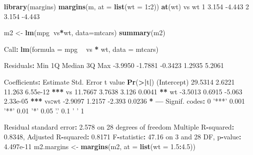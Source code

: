 \documentclass[]{article}
\newenvironment{Shaded}{\begin{snugshade}}{\end{snugshade}}
\newcommand{\DataTypeTok}[1]{\textcolor[rgb]{0.13,0.29,0.53}{#1}}
\newcommand{\DecValTok}[1]{\textcolor[rgb]{0.00,0.00,0.81}{#1}}
\newcommand{\ErrorTok}[1]{\textcolor[rgb]{0.64,0.00,0.00}{\textbf{#1}}}
\newcommand{\FloatTok}[1]{\textcolor[rgb]{0.00,0.00,0.81}{#1}}
\newcommand{\KeywordTok}[1]{\textcolor[rgb]{0.13,0.29,0.53}{\textbf{#1}}}
\newcommand{\NormalTok}[1]{#1}
\newcommand{\OperatorTok}[1]{\textcolor[rgb]{0.81,0.36,0.00}{\textbf{#1}}}
\newcommand{\StringTok}[1]{\textcolor[rgb]{0.31,0.60,0.02}{#1}}
\begin{document}
\begin{Shaded}
\begin{Highlighting}[]
\KeywordTok{library}\NormalTok{(margins)}
\KeywordTok{margins}\NormalTok{(m, }\DataTypeTok{at =} \KeywordTok{list}\NormalTok{(}\DataTypeTok{wt =} \DecValTok{1}\OperatorTok{:}\DecValTok{2}\NormalTok{))}
 \KeywordTok{at}\NormalTok{(wt)    vs     wt}
      \DecValTok{1} \FloatTok{3.154} \FloatTok{-4.443}
      \DecValTok{2} \FloatTok{3.154} \FloatTok{-4.443}

\NormalTok{m2 <-}\StringTok{ }\KeywordTok{lm}\NormalTok{(mpg}\OperatorTok{~}\NormalTok{vs}\OperatorTok{*}\NormalTok{wt, }\DataTypeTok{data=}\NormalTok{mtcars)}
\KeywordTok{summary}\NormalTok{(m2)}

\NormalTok{Call}\OperatorTok{:}
\KeywordTok{lm}\NormalTok{(}\DataTypeTok{formula =}\NormalTok{ mpg }\OperatorTok{~}\StringTok{ }\NormalTok{vs }\OperatorTok{*}\StringTok{ }\NormalTok{wt, }\DataTypeTok{data =}\NormalTok{ mtcars)}

\NormalTok{Residuals}\OperatorTok{:}
\StringTok{    }\NormalTok{Min      1Q  Median      3Q     Max }
\FloatTok{-3.9950} \FloatTok{-1.7881} \FloatTok{-0.3423}  \FloatTok{1.2935}  \FloatTok{5.2061} 

\NormalTok{Coefficients}\OperatorTok{:}
\StringTok{            }\NormalTok{Estimate Std. Error t value }\KeywordTok{Pr}\NormalTok{(}\OperatorTok{>}\ErrorTok{|}\NormalTok{t}\OperatorTok{|}\NormalTok{)    }
\NormalTok{(Intercept)  }\FloatTok{29.5314}     \FloatTok{2.6221}  \FloatTok{11.263} \FloatTok{6.55e-12} \OperatorTok{**}\ErrorTok{*}
\NormalTok{vs           }\FloatTok{11.7667}     \FloatTok{3.7638}   \FloatTok{3.126}   \FloatTok{0.0041} \OperatorTok{**}\StringTok{ }
\NormalTok{wt           }\FloatTok{-3.5013}     \FloatTok{0.6915}  \FloatTok{-5.063} \FloatTok{2.33e-05} \OperatorTok{**}\ErrorTok{*}
\NormalTok{vs}\OperatorTok{:}\NormalTok{wt        }\FloatTok{-2.9097}     \FloatTok{1.2157}  \FloatTok{-2.393}   \FloatTok{0.0236} \OperatorTok{*}\StringTok{  }
\OperatorTok{---}
\NormalTok{Signif. codes}\OperatorTok{:}\StringTok{  }\DecValTok{0} \StringTok{'***'} \FloatTok{0.001} \StringTok{'**'} \FloatTok{0.01} \StringTok{'*'} \FloatTok{0.05} \StringTok{'.'} \FloatTok{0.1} \StringTok{' '} \DecValTok{1}

\NormalTok{Residual standard error}\OperatorTok{:}\StringTok{ }\FloatTok{2.578}\NormalTok{ on }\DecValTok{28}\NormalTok{ degrees of freedom}
\NormalTok{Multiple R}\OperatorTok{-}\NormalTok{squared}\OperatorTok{:}\StringTok{  }\FloatTok{0.8348}\NormalTok{,    Adjusted R}\OperatorTok{-}\NormalTok{squared}\OperatorTok{:}\StringTok{  }\FloatTok{0.8171} 
\NormalTok{F}\OperatorTok{-}\NormalTok{statistic}\OperatorTok{:}\StringTok{ }\FloatTok{47.16}\NormalTok{ on }\DecValTok{3}\NormalTok{ and }\DecValTok{28}\NormalTok{ DF,  p}\OperatorTok{-}\NormalTok{value}\OperatorTok{:}\StringTok{ }\FloatTok{4.497e-11}
\NormalTok{m2.margins <-}\StringTok{ }\KeywordTok{margins}\NormalTok{(m2, }\DataTypeTok{at =} \KeywordTok{list}\NormalTok{(}\DataTypeTok{wt =} \FloatTok{1.5}\OperatorTok{:}\FloatTok{4.5}\NormalTok{))}


\end{Highlighting}
\end{Shaded}
\end{document}
